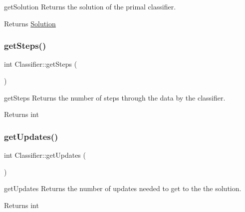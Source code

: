 get\+Solution Returns the solution of the primal classifier. 

\begin{DoxyReturn}{Returns}
\hyperlink{class_solution}{Solution} 
\end{DoxyReturn}
\mbox{\label{class_classifier_a1fb3e4dfd80c154e89603c8fa1b11b76}} 
\subsubsection{\texorpdfstring{get\+Steps()}{getSteps()}}
{\footnotesize\ttfamily int Classifier\+::get\+Steps (\begin{DoxyParamCaption}{ }\end{DoxyParamCaption})\hspace{0.3cm}{\ttfamily [inline]}}



get\+Steps Returns the number of steps through the data by the classifier. 

\begin{DoxyReturn}{Returns}
int 
\end{DoxyReturn}
\mbox{\label{class_classifier_a738c2fbed982db6cad02062edcc037e4}} 
\subsubsection{\texorpdfstring{get\+Updates()}{getUpdates()}}
{\footnotesize\ttfamily int Classifier\+::get\+Updates (\begin{DoxyParamCaption}{ }\end{DoxyParamCaption})\hspace{0.3cm}{\ttfamily [inline]}}



get\+Updates Returns the number of updates needed to get to the the solution. 

\begin{DoxyReturn}{Returns}
int 
\end{DoxyReturn}
\mbox{\label{class_classifier_a3293d7d39c3934503a23b920f84f73e7}} 

